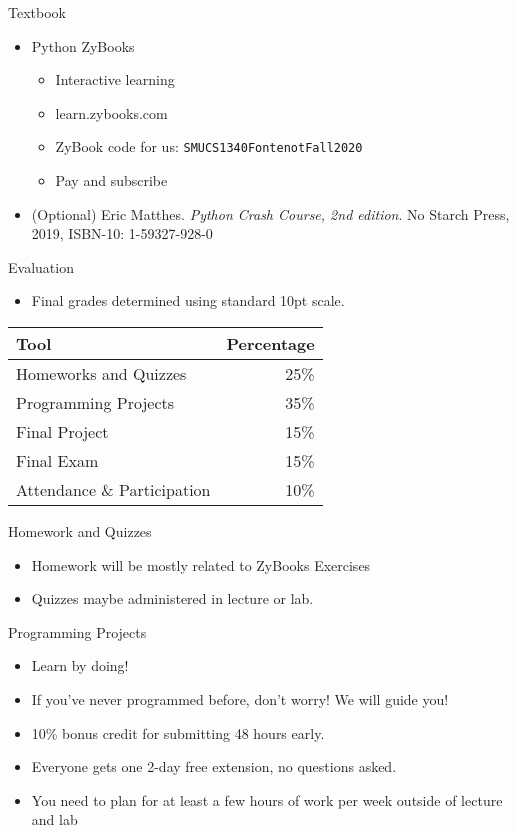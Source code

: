 \documentclass[
  11pt,
  ignorenonframetext,
]{beamer}
\providecommand{\tightlist}{%
  \setlength{\itemsep}{0pt}\setlength{\parskip}{0pt}}
\begin{document}
\begin{frame}[fragile]{Textbook}
\protect\hypertarget{textbook}{}
\begin{itemize}
\tightlist
\item
  Python ZyBooks

  \begin{itemize}
  \tightlist
  \item
    Interactive learning
  \item
    learn.zybooks.com
  \item
    ZyBook code for us: \texttt{SMUCS1340FontenotFall2020}
  \item
    Pay and subscribe
  \end{itemize}
\item
  (Optional) Eric Matthes. \emph{Python Crash Course, 2nd edition}. No
  Starch Press, 2019, ISBN-10: 1-59327-928-0
\end{itemize}
\end{frame}

\begin{frame}{Evaluation}
\protect\hypertarget{evaluation}{}
\begin{itemize}
\tightlist
\item
  Final grades determined using standard 10pt scale.
\end{itemize}

\begin{longtable}[]{@{}lr@{}}
\toprule
Tool & Percentage\tabularnewline
\midrule
\endhead
Homeworks and Quizzes & 25\%\tabularnewline
Programming Projects & 35\%\tabularnewline
Final Project & 15\%\tabularnewline
Final Exam & 15\%\tabularnewline
Attendance \& Participation & 10\%\tabularnewline
\bottomrule
\end{longtable}
\end{frame}

\begin{frame}{Homework and Quizzes}
\protect\hypertarget{homework-and-quizzes}{}
\begin{itemize}
\tightlist
\item
  Homework will be mostly related to ZyBooks Exercises
\item
  Quizzes maybe administered in lecture or lab.
\end{itemize}
\end{frame}

\begin{frame}{Programming Projects}
\protect\hypertarget{programming-projects}{}
\begin{itemize}
\tightlist
\item
  Learn by doing!
\item
  If you've never programmed before, don't worry! We will guide you!
\item
  10\% bonus credit for submitting 48 hours early.
\item
  Everyone gets one 2-day free extension, no questions asked.\\
\item
  You need to plan for at least a few hours of work per week outside of
  lecture and lab
\end{itemize}
\end{frame}
\end{document}
